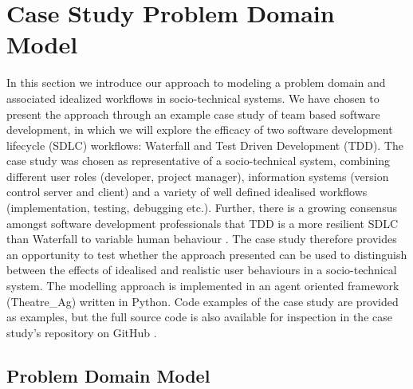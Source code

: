 \documentclass{llncs}
\begin{document}

\section{Case Study Problem Domain Model}
\label{sec:case-study}


In this section we introduce our approach to modeling a problem domain and associated idealized workflows in
socio-technical systems.  We have chosen to present the approach through an example case study of team based software
development, in which we will explore the efficacy of two software development lifecycle (SDLC) workflows: Waterfall and
Test Driven Development (TDD).  The case study was chosen as representative of a socio-technical system, combining
different user roles (developer, project manager), information systems (version control server and client) and a variety
of well defined idealised workflows (implementation, testing, debugging etc.).  Further, there is a growing consensus
amongst software development professionals that TDD is a more resilient SDLC than Waterfall to variable human behaviour
\citep{Bhat2006TestDrivenDevelopment,George2004TestDrivenDevelopment,Huang2009EmpiricalTestFirstProgramming}.  The case
study therefore provides an opportunity to test whether the approach presented can be used to distinguish between the
effects of idealised and realistic user behaviours in a socio-technical system.  The modelling approach is implemented
in an agent oriented framework (Theatre\_Ag) written in Python.  Code examples of the case study are provided as
examples, but the full source code is also available for inspection in the case study's repository on GitHub
\cite{storer2016softdev-workflow-scm}.


\subsection{Problem Domain Model}

\end{document}
